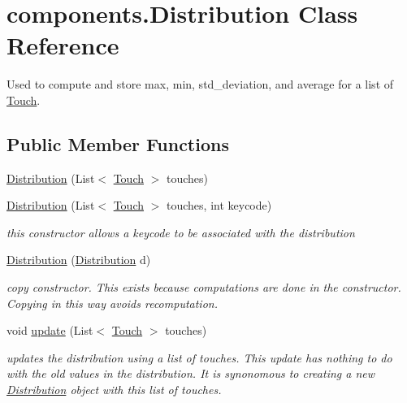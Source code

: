 \hypertarget{classcomponents_1_1_distribution}{}\section{components.\+Distribution Class Reference}
\label{classcomponents_1_1_distribution}


Used to compute and store max, min, std\+\_\+deviation, and average for a list of \hyperlink{classcomponents_1_1_touch}{Touch}.  


\subsection*{Public Member Functions}
\begin{DoxyCompactItemize}
\item 
\hyperlink{classcomponents_1_1_distribution_a0aef5c1c0f3732a9acc45001a251f345}{Distribution} (List$<$ \hyperlink{classcomponents_1_1_touch}{Touch} $>$ touches)
\item 
\hyperlink{classcomponents_1_1_distribution_a5c1988b4cf235e87955df659df3e15b0}{Distribution} (List$<$ \hyperlink{classcomponents_1_1_touch}{Touch} $>$ touches, int keycode)
\begin{DoxyCompactList}\small\item\em this constructor allows a keycode to be associated with the distribution \end{DoxyCompactList}\item 
\hyperlink{classcomponents_1_1_distribution_ab388f6790c565f71f29dc00cfdbd14fb}{Distribution} (\hyperlink{classcomponents_1_1_distribution}{Distribution} d)
\begin{DoxyCompactList}\small\item\em copy constructor. This exists because computations are done in the constructor. Copying in this way avoids recomputation. \end{DoxyCompactList}\item 
void \hyperlink{classcomponents_1_1_distribution_a1a29a26cfd0b9c6e0b7c2b2639c47880}{update} (List$<$ \hyperlink{classcomponents_1_1_touch}{Touch} $>$ touches)
\begin{DoxyCompactList}\small\item\em updates the distribution using a list of touches. This update has nothing to do with the old values in the distribution. It is synonomous to creating a new \hyperlink{classcomponents_1_1_distribution}{Distribution} object with this list of touches. \end{DoxyCompactList}\item 

\end{DoxyCompactItemize}
